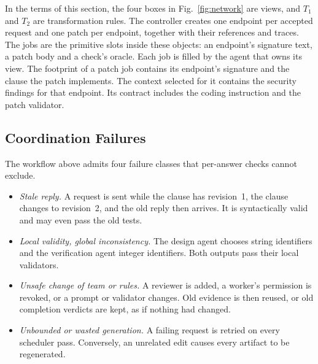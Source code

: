 \documentclass[10pt,journal,compsoc]{IEEEtran}
\theoremstyle{plain}
\theoremstyle{definition}
\begin{document}
In the terms of this section, the four boxes in Fig.~\ref{fig:network} are views, and $T_1$ and $T_2$ are transformation rules. The controller creates one endpoint per accepted request and one patch per endpoint, together with their references and traces. The jobs are the primitive slots inside these objects: an endpoint's signature text, a patch body and a check's oracle. Each job is filled by the agent that owns its view. The footprint of a patch job contains its endpoint's signature and the clause the patch implements. The context selected for it contains the security findings for that endpoint. Its contract includes the coding instruction and the patch validator.

\subsection{Coordination Failures}\label{sec:failures}
The workflow above admits four failure classes that per-answer checks cannot exclude.
\begin{itemize}
\item[\textbf{F1}] \emph{Stale reply.} A request is sent while the clause has revision~1, the clause changes to revision~2, and the old reply then arrives. It is syntactically valid and may even pass the old tests.
\item[\textbf{F2}] \emph{Local validity, global inconsistency.} The design agent chooses string identifiers and the verification agent integer identifiers. Both outputs pass their local validators.
\item[\textbf{F3}] \emph{Unsafe change of team or rules.} A reviewer is added, a worker's permission is revoked, or a prompt or validator changes. Old evidence is then reused, or old completion verdicts are kept, as if nothing had changed.
\item[\textbf{F4}] \emph{Unbounded or wasted generation.} A failing request is retried on every scheduler pass. Conversely, an unrelated edit causes every artifact to be regenerated.
\end{itemize}
\end{document}
